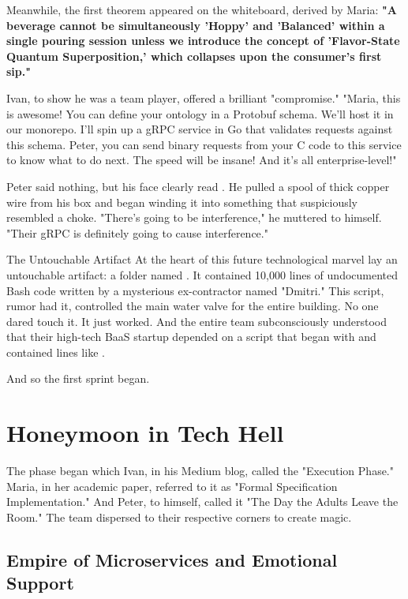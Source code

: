 Meanwhile, the first theorem appeared on the whiteboard, derived by Maria: \textbf{"A beverage cannot be simultaneously 'Hoppy' and 'Balanced' within a single pouring session unless we introduce the concept of 'Flavor-State Quantum Superposition,' which collapses upon the consumer's first sip."}

Ivan, to show he was a team player, offered a brilliant "compromise." "Maria, this is awesome! You can define your ontology in a Protobuf schema. We'll host it in our monorepo. I'll spin up a gRPC service in Go that validates requests against this schema. Peter, you can send binary requests from your C code to this service to know what to do next. The speed will be insane! And it's all enterprise-level!"

Peter said nothing, but his face clearly read . He pulled a spool of thick copper wire from his box and began winding it into something that suspiciously resembled a choke. "There's going to be interference," he muttered to himself. "Their gRPC is definitely going to cause interference."

\begin{infobox}{The Untouchable Artifact}
At the heart of this future technological marvel lay an untouchable artifact: a folder named . It contained 10,000 lines of undocumented Bash code written by a mysterious ex-contractor named "Dmitri." This script, rumor had it, controlled the main water valve for the entire building. No one dared touch it. It just worked. And the entire team subconsciously understood that their high-tech BaaS startup depended on a script that began with  and contained lines like .
\end{infobox}

And so the first sprint began.

\section{Honeymoon in Tech Hell}
\label{sec:parable_honeymoon}

The phase began which Ivan, in his Medium blog, called the "Execution Phase." Maria, in her academic paper, referred to it as "Formal Specification Implementation." And Peter, to himself, called it "The Day the Adults Leave the Room." The team dispersed to their respective corners to create magic.

\subsection*{Empire of Microservices and Emotional Support}

